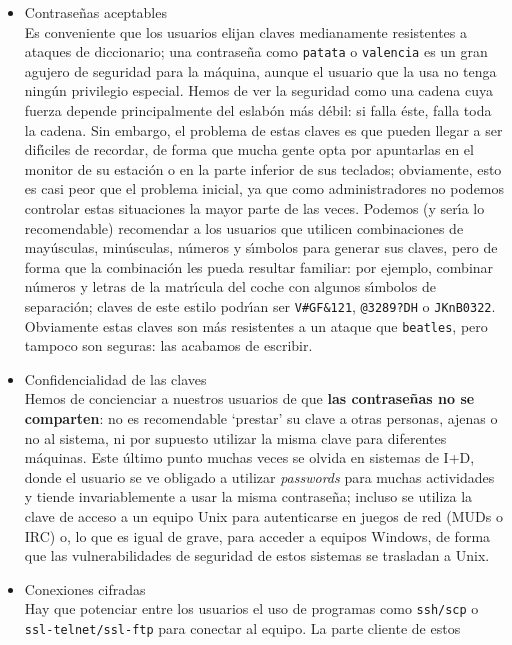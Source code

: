 \begin{itemize}
\item Contrase\~nas aceptables\\
Es conveniente que los usuarios elijan claves medianamente resistentes a ataques
de diccionario; una contrase\~na como {\tt patata} o {\tt valencia} es un 
gran agujero de seguridad para la m\'aquina, aunque el usuario que la usa no 
tenga ning\'un privilegio especial. Hemos de ver la seguridad como una cadena
cuya fuerza depende principalmente del eslab\'on m\'as d\'ebil: si falla \'este,
falla toda la cadena. Sin embargo, el problema de estas claves es que pueden
llegar a ser dif\'{\i}ciles de recordar, de forma que mucha gente opta por 
apuntarlas en el monitor de su estaci\'on o en la parte inferior de sus 
teclados; obviamente, esto es casi peor que el problema inicial, ya que como
administradores no podemos controlar estas situaciones la mayor parte de las
veces. Podemos (y ser\'{\i}a lo recomendable) recomendar a los usuarios que
utilicen combinaciones de may\'usculas, min\'usculas, n\'umeros y s\'{\i}mbolos
para generar sus claves, pero de forma que la combinaci\'on les pueda resultar
familiar: por ejemplo, combinar n\'umeros y letras de la matr\'{\i}cula del
coche con algunos s\'{\i}mbolos de separaci\'on; claves de este estilo
podr\'{\i}an ser {\tt V\#GF\&121}, {\tt @3289?DH} o {\tt JKnB0322}. Obviamente
estas claves son m\'as resistentes a un ataque que {\tt beatles}, pero tampoco
son seguras: las acabamos de escribir.
\item Confidencialidad de las claves\\
Hemos de concienciar a nuestros usuarios de que {\bf las contrase\~nas no se
comparten}: no es recomendable `prestar' su clave a otras personas, ajenas o
no al sistema, ni por supuesto utilizar la misma clave para diferentes 
m\'aquinas. Este \'ultimo punto muchas veces se olvida en sistemas de I+D, donde
el usuario se ve obligado a utilizar {\it passwords} para muchas actividades y
tiende invariablemente a usar la misma contrase\~na; incluso se utiliza la 
clave de acceso a un equipo Unix para autenticarse en juegos de red (MUDs o
IRC) o, lo que es igual de grave, para acceder a equipos Windows, de forma que
las vulnerabilidades de seguridad de estos sistemas se trasladan a Unix.
\item Conexiones cifradas\\
Hay que potenciar entre los usuarios el uso de programas como {\tt ssh/scp} o\\ 
{\tt ssl-telnet/ssl-ftp} para conectar al equipo. La parte cliente de estos

\end{itemize}
